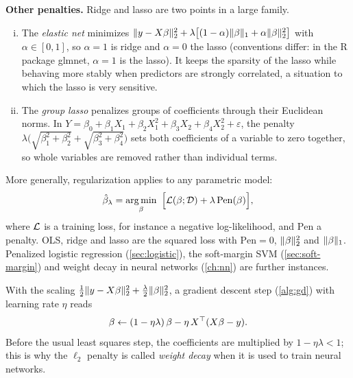 \smallskip\noindent\textbf{Other penalties.} Ridge and lasso are two points in a large family.
\begin{enumerate}[(i)]
  \item The \emph{elastic net} minimizes $\lVert y-X\beta\rVert_2^2+\lambda\big[(1-\alpha)\lVert \beta\rVert_1+\alpha\lVert \beta\rVert_2^2\big]$ with $\alpha\in[0,1]$, so $\alpha=1$ is ridge and $\alpha=0$ the lasso (conventions differ: in the R package glmnet, $\alpha=1$ is the lasso). It keeps the sparsity of the lasso while behaving more stably when predictors are strongly correlated, a situation to which the lasso is very sensitive.
  \item The \emph{group lasso} penalizes groups of coefficients through their Euclidean norms. In $Y=\beta_0+\beta_1X_1+\beta_2X_1^2+\beta_3X_2+\beta_4X_2^2+\varepsilon$, the penalty $\lambda\big(\sqrt{\beta_1^2+\beta_2^2}+\sqrt{\beta_3^2+\beta_4^2}\big)$ sets both coefficients of a variable to zero together, so whole variables are removed rather than individual terms.
\end{enumerate}

More generally, regularization applies to any parametric model:
\begin{equation}\label{eq:penalized-erm}
\hat\beta_\lambda=\argmin_\beta\ \Big[\cL(\beta;\cD)+\lambda\,\mathrm{Pen}(\beta)\Big],
\end{equation}
where $\mathcal{L}$ is a training loss, for instance a negative log-likelihood, and $\mathrm{Pen}$ a penalty. OLS, ridge and lasso are the squared loss with $\mathrm{Pen}=0$, $\lVert \beta\rVert_2^2$ and $\lVert \beta\rVert_1$. Penalized logistic regression (\cref{sec:logistic}), the soft-margin SVM (\cref{sec:soft-margin}) and weight decay in neural networks (\cref{ch:nn}) are further instances.

\begin{remark}\label{rem:weight-decay}
With the scaling $\frac12\lVert y-X\beta\rVert_2^2+\frac\lambda2\lVert \beta\rVert_2^2$, a gradient descent step (\cref{alg:gd}) with learning rate $\eta$ reads
\[
\beta\gets(1-\eta\lambda)\,\beta-\eta\,X^{\top}(X\beta-y).
\]
Before the usual least squares step, the coefficients are multiplied by $1-\eta\lambda<1$; this is why the $\ell_2$ penalty is called \emph{weight decay} when it is used to train neural networks.
\end{remark}

